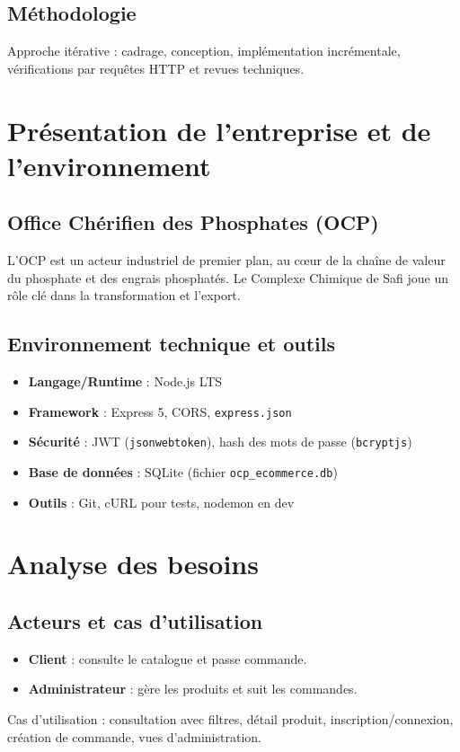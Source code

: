 \documentclass[12pt,a4paper]{report}
\begin{document}
\section{Méthodologie}
Approche itérative : cadrage, conception, implémentation incrémentale, vérifications par requêtes HTTP et revues techniques.

\chapter{Présentation de l'entreprise et de l'environnement}
\section{Office Chérifien des Phosphates (OCP)}
L'OCP est un acteur industriel de premier plan, au cœur de la chaîne de valeur du phosphate et des engrais phosphatés. Le Complexe Chimique de Safi joue un rôle clé dans la transformation et l'export.

\section{Environnement technique et outils}
\begin{itemize}
  \item \textbf{Langage/Runtime} : Node.js LTS
  \item \textbf{Framework} : Express 5, CORS, \texttt{express.json}
  \item \textbf{Sécurité} : JWT (\texttt{jsonwebtoken}), hash des mots de passe (\texttt{bcryptjs})
  \item \textbf{Base de données} : SQLite (fichier \texttt{ocp\_ecommerce.db})
  \item \textbf{Outils} : Git, cURL pour tests, nodemon en dev
\end{itemize}

\chapter{Analyse des besoins}
\section{Acteurs et cas d'utilisation}
\begin{itemize}
  \item \textbf{Client} : consulte le catalogue et passe commande.
  \item \textbf{Administrateur} : gère les produits et suit les commandes.
\end{itemize}
Cas d'utilisation : consultation avec filtres, détail produit, inscription/connexion, création de commande, vues d'administration.
\end{document}
